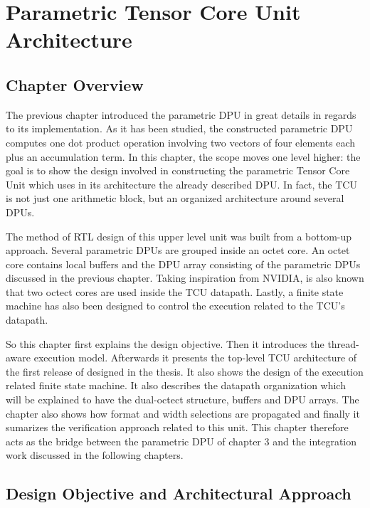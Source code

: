 \chapter{Parametric Tensor Core Unit Architecture}
\label{ch}

\section{Chapter Overview}

The previous chapter introduced the parametric DPU in great details in regards to its implementation. As it has been studied, the constructed parametric DPU computes one dot product operation involving two vectors of four elements each plus an accumulation term. In this chapter, the scope moves one level higher: the goal is to show the design involved in constructing the parametric Tensor Core Unit which uses in its architecture the already described DPU. In fact, the TCU is not just one arithmetic block, but an organized architecture around several DPUs.

The method of RTL design of this upper level unit was built from a bottom-up approach. Several parametric DPUs are grouped inside an octet core. An octet core contains local buffers and the DPU array consisting of the parametric DPUs discussed in the previous chapter. Taking inspiration from NVIDIA, is also known that two octect cores are used inside the TCU datapath. Lastly, a finite state machine has also been designed to control the execution related to the TCU's datapath. 

So this chapter first explains the design objective. Then it introduces the thread-aware execution model. Afterwards it presents the top-level TCU architecture of the first release of designed in the thesis. It also shows the design of the execution related finite state machine. It also describes the datapath organization which will be explained to have the dual-octect structure, buffers and DPU arrays. The chapter also shows how format and width selections are propagated and finally it sumarizes the verification approach related to this unit. This chapter therefore acts as the bridge between the parametric DPU of chapter 3 and the integration work discussed in the following chapters.

\section{Design Objective and Architectural Approach}


